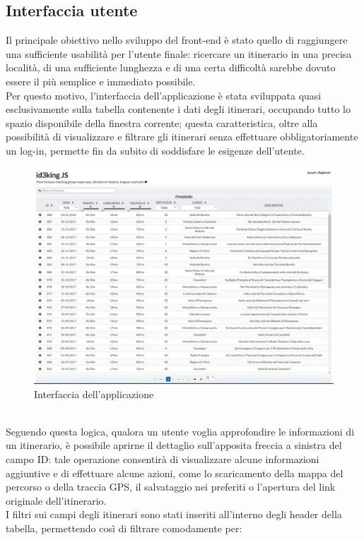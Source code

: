 \documentclass[11pt]{report}
\begin{document}
\subsection{Interfaccia utente}
Il principale obiettivo nello sviluppo del front-end è stato quello di raggiungere una sufficiente usabilità per l'utente finale: ricercare un itinerario in una precisa località, di una sufficiente lunghezza e di una certa difficoltà sarebbe dovuto essere il più semplice e immediato possibile.
\\Per questo motivo, l'interfaccia dell'applicazione è stata sviluppata quasi esclusivamente sulla tabella contenente i dati degli itinerari, occupando tutto lo spazio disponibile della finestra corrente; questa caratteristica, oltre alla possibilità di visualizzare e filtrare gli itinerari senza effettuare obbligatoriamente un log-in, permette fin da subito di soddisfare le esigenze dell'utente.
\begin{figure}[h]
	\centering
	\includegraphics[scale=0.35]{ui_1.png}
	\caption{Interfaccia dell'applicazione \label{ui_1}}
\end{figure}
\\Seguendo questa logica, qualora un utente voglia approfondire le informazioni di un itinerario, è possibile aprirne il dettaglio sull'apposita freccia a sinistra del campo ID: tale operazione consentirà di visualizzare alcune informazioni aggiuntive e di effettuare alcune azioni, come lo scaricamento della mappa del percorso o della traccia GPS, il salvataggio nei preferiti o l'apertura del link originale dell'itinerario.
\\I filtri sui campi degli itinerari sono stati inseriti all'interno degli header della tabella, permettendo così di filtrare comodamente per:
\end{document}

